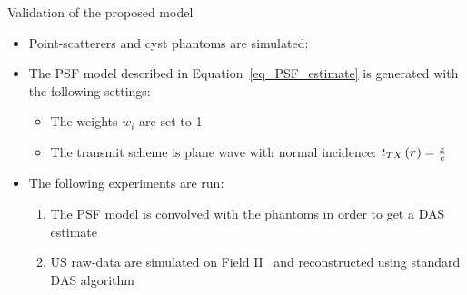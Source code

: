 {\begin{block}{Validation of the proposed model}
	\begin{itemize}
		\item Point-scatterers and cyst phantoms are simulated: 
		\item The PSF model described in Equation~\eqref{eq_PSF_estimate} is generated with the following settings:
		\begin{itemize}
			\item The weights $w_i$ are set to 1
			\item The transmit scheme is plane wave with normal incidence: $t_{TX} \left(\bm{r}\right) = \frac{z}{c}$
		\end{itemize}
		\item The following experiments are run:
		\begin{enumerate}
			\item The PSF model is convolved with the phantoms in order to get a DAS estimate
			\item US raw-data are simulated on Field II~\cite{jensen1992} and reconstructed using standard DAS algorithm
		\end{enumerate}
	\end{itemize}
	\newlength{\CIRSFigWidth} \setlength{\CIRSFigWidth}{0.48\textwidth}
	\newlength{\CIRSFigHeight}

\end{block}}
